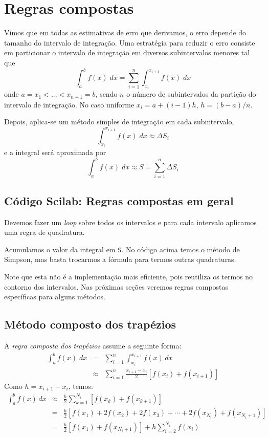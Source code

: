 \section{Regras compostas}

Vimos que em todas as estimativas de erro que derivamos, o erro depende do tamanho do intervalo de integração. Uma estratégia para reduzir o erro consiste em particionar o intervalo de integração em diversos subintervalos menores tal que
\begin{equation*}
\int_{a}^b f(x)\;dx=\sum_{i=1}^{n} \int_{x_i}^{x_{i+1}} f(x)\;dx 
\end{equation*}
onde $a=x_1<...<x_{n+1}=b$, sendo $n$ o número de subintervalos da partição do intervalo de integração. No caso uniforme $x_i = a + (i-1)h$, $h = (b-a)/n$.

Depois, aplica-se um método simples de integração em cada subintervalo,
$$
\int_{x_i}^{x_{i+1}} f(x)\;dx \approx \Delta S_i
$$
e a integral será aproximada por
$$
\int_a^b f(x)\;dx \approx S= \sum_{i=1}^{n} \Delta S_i
$$

\ifisscilab
\subsection{Código Scilab: Regras compostas em geral}
Devemos fazer um {\it loop} sobre todos os intervalos e para cada intervalo aplicamos uma regra de quadratura. 



Acumulamos o valor da integral em \verb+S+. No código acima temos o método de Simpson, mas basta trocarmos a fórmula para termos outras quadraturas.

Note que esta não é a implementação mais eficiente, pois reutiliza os termos no contorno dos intervalos. Nas próximas seções veremos regras compostas específicas para alguns métodos.
\fi

\subsection{Método composto dos trapézios}
A \emph{regra composta dos trapézios} assume a seguinte forma:
\begin{eqnarray*}
  \int_{a}^b f(x)\;dx &=& \sum_{i=1}^{n} \int_{x_i}^{x_{i+1}}f(x)\,dx \\
  &\approx& \sum_{i=1}^{n} \frac{x_{i+1}-x_i}{2}\left[f(x_i)+f(x_{i+1})\right]
\end{eqnarray*}
Como $h = x_{i+1} - x_i$, temos:
\begin{eqnarray*}
\int_{a}^b f(x)\,dx &\approx& \frac{h}{2}\sum_{k=1}^{N_i}\left[f(x_k)+f(x_{k+1})\right]\\
&=& \frac{h}{2}\left[f(x_1)+2f(x_2)+2f(x_3)+\cdots + 2f(x_{N_i})+f(x_{N_i+1})\right]\\
&=& \frac{h}{2}\left[f(x_1) + f(x_{N_i+1})\right] + h\sum_{i=2}^{N_i} f(x_i)
\end{eqnarray*}

